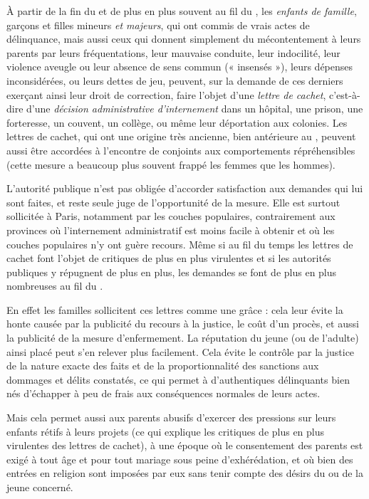  À partir de la fin du  et de plus en plus souvent au fil du , les \emph{enfants de famille}, garçons et filles mineurs \emph{et majeurs}, qui ont commis de vrais actes de délinquance, mais aussi ceux qui donnent simplement du mécontentement à leurs parents par leurs fréquentations, leur mauvaise conduite, leur indocilité, leur violence aveugle ou leur absence de sens commun (« insensés »), leurs dépenses inconsidérées, ou leurs dettes de jeu, peuvent, sur la demande de ces derniers exerçant ainsi leur droit de correction, faire l'objet d'une \emph{lettre de cachet}, c'est-à-dire d'une \emph{décision administrative d'internement} dans un hôpital, une prison, une forteresse, un couvent, un collège, ou même leur déportation aux colonies. Les lettres de cachet, qui ont une origine très ancienne, bien antérieure au , peuvent aussi être accordées à l'encontre de conjoints aux comportements répréhensibles (cette mesure a beaucoup plus souvent frappé les femmes que les hommes). 

 L'autorité publique n'est pas obligée d'accorder satisfaction aux demandes qui lui sont faites, et reste seule juge de l'opportunité de la mesure. Elle est surtout sollicitée à Paris, notamment par les couches populaires, contrairement aux provinces où l'internement administratif est moins facile à obtenir et où les couches populaires n'y ont guère recours. Même si au fil du temps les lettres de cachet font l'objet de critiques de plus en plus virulentes et si les autorités publiques y répugnent de plus en plus, les demandes se font de plus en plus nombreuses au fil du . 

 En effet les familles sollicitent ces lettres comme une grâce : cela leur évite la honte causée par la publicité du recours à la justice, le coût d'un procès, et aussi la publicité de la mesure d'enfermement. La réputation du jeune (ou de l'adulte) ainsi placé peut s'en relever plus facilement. Cela évite le contrôle par la justice de la nature exacte des faits et de la proportionnalité des sanctions aux dommages et délits constatés, ce qui permet à d'authentiques délinquants bien nés d'échapper à peu de frais aux conséquences normales de leurs actes. 

 Mais cela permet aussi aux parents abusifs d'exercer des pressions sur leurs enfants rétifs à leurs projets (ce qui explique les critiques de plus en plus virulentes des lettres de cachet), à une époque où le consentement des parents est exigé à tout âge et pour tout mariage sous peine d'exhérédation, et où bien des entrées en religion sont imposées par eux sans tenir compte des désirs du ou de la jeune concerné. 

